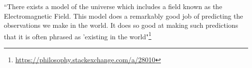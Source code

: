     \begin{tcolorbox}[
        colbacktitle=red!10!white,
        colback=blue!10!white,coltitle=red!70!black,
        title=Does the Electromagnetic Field \textit{physically} exist?
    ]
        ``There exists a model of the universe which includes a field known as the Electromagnetic Field. This
        model does a remarkably good job of predicting the observations we make in the world. It does so good at
        making such predictions that it is often phrased as 'existing in the
        world"\footnote{\href{https://philosophy.stackexchange.com/a/28010}{https://philosophy.stackexchange.com/a/28010}}
    \end{tcolorbox}

    

